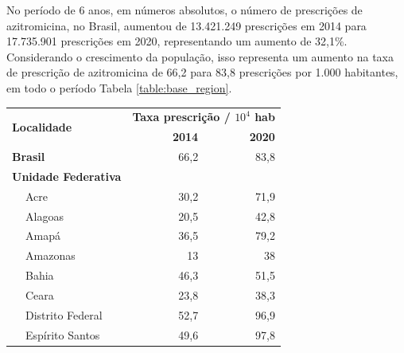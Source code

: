     No período de 6 anos, em números absolutos, o número de prescrições de azitromicina, no Brasil, aumentou de 13.421.249 prescrições em 2014 para 17.735.901 prescrições em 2020, representando um aumento de 32,1\%. Considerando o crescimento da população, isso representa um aumento na taxa de prescrição de azitromicina de 66,2 para 83,8 prescrições por 1.000 habitantes, em todo o período Tabela \ref{table:base_region}. 


    \begin{table}[!htbp]
        \centering
    \begin{tabular}{llrr}
    \hline
    \multicolumn{2}{l}{\multirow{2}{*}{\textbf{Localidade}}} & \multicolumn{2}{l}{\textbf{Taxa prescrição / $10^4$ hab}} \\ \cline{3-4} 

    \multicolumn{2}{l}{}                                     & \textbf{2014}              & \textbf{2020}              \\ \hline
    \multicolumn{2}{l}{\textbf{Brasil}}                      & 66,2                       & 83,8                       \\
    \multicolumn{2}{l}{\textbf{Unidade Federativa}}          &                            &                            \\
                      & Acre                                 & 30,2                       & 71,9                       \\
                      & Alagoas                              & 20,5                       & 42,8                       \\
                      & Amapá                                & 36,5                       & 79,2                       \\
                      & Amazonas                             & 13                         & 38                         \\
                      & Bahia                                & 46,3                       & 51,5                       \\
                      & Ceara                                & 23,8                       & 38,3                       \\
                      & Distrito Federal                     & 52,7                       & 96,9                       \\
                      & Espírito Santos                      & 49,6                       & 97,8                       \\

\end{tabular}
\end{table}

